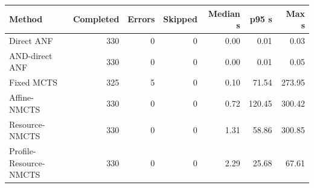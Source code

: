 \begin{tabular}{lrrrrrr}
\toprule
Method & Completed & Errors & Skipped & Median s & p95 s & Max s \\
\midrule
Direct ANF & 330 & 0 & 0 & 0.00 & 0.01 & 0.03 \\
AND-direct ANF & 330 & 0 & 0 & 0.00 & 0.01 & 0.05 \\
Fixed MCTS & 325 & 5 & 0 & 0.10 & 71.54 & 273.95 \\
Affine-NMCTS & 330 & 0 & 0 & 0.72 & 120.45 & 300.42 \\
Resource-NMCTS & 330 & 0 & 0 & 1.31 & 58.86 & 300.85 \\
Profile-Resource-NMCTS & 330 & 0 & 0 & 2.29 & 25.68 & 67.61 \\
\bottomrule
\end{tabular}
